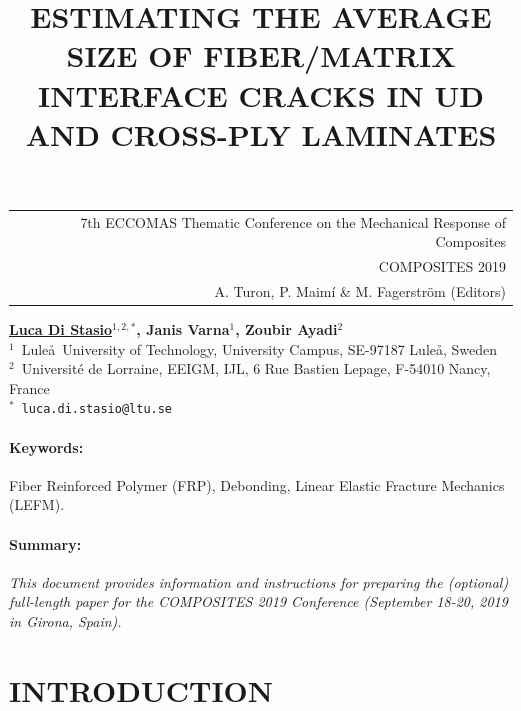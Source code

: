 \documentclass[12pt,a4paper]{article}
\begin{document}
\thispagestyle{empty}

\vspace*{-3.4cm}
\begin{table}[!h]
\begin{tabular}{r}
\hspace*{5.5cm} \scriptsize \textsf{7th ECCOMAS Thematic Conference on the Mechanical Response of Composites} \\
\hspace*{5.5cm} \scriptsize \textsf{ COMPOSITES 2019} \\
\hspace*{5.5cm} \tiny \textsf{A. Turon, P. Maimí \& M. Fagerström (Editors)}
\end{tabular}
\end{table}

\begin{center}
\title{ESTIMATING THE AVERAGE SIZE OF FIBER/MATRIX INTERFACE CRACKS IN UD AND CROSS-PLY LAMINATES}
\end{center}
\begin{center}
\textbf{\underline{Luca Di Stasio}$^{1,2,*}$, Janis Varna$^{1}$, Zoubir Ayadi$^{2}$} \\ [7pt]
\small{$^1$~Lule\aa\ University of Technology, University Campus, SE-97187 Lule\aa, Sweden}  \\  [2pt]  
\small{$^2$~Universit\'e de Lorraine, EEIGM, IJL, 6 Rue Bastien Lepage, F-54010 Nancy, France}  \\  [2pt]
\small{$^*$~\texttt{luca.di.stasio@ltu.se}} \\
\end{center}


\paragraph{Keywords:} Fiber Reinforced Polymer (FRP), Debonding, Linear Elastic Fracture Mechanics (LEFM).

\paragraph{Summary:} \textit{This document provides information and instructions for preparing the (optional) full-length paper for the COMPOSITES 2019 Conference (September 18-20, 2019 in Girona, Spain).}

\section{INTRODUCTION}
\end{document}
